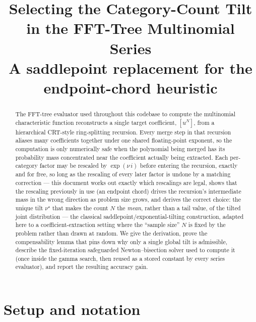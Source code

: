 \documentclass[11pt]{article}
\title{Selecting the Category-Count Tilt in the FFT-Tree Multinomial Series\\
\large A saddlepoint replacement for the endpoint-chord heuristic}
\author{}
\date{}
\begin{document}
\maketitle

\begin{abstract}
The FFT-tree evaluator used throughout this codebase to compute the multinomial
characteristic function reconstructs a single target coefficient, $[u^N]$, from a
hierarchical CRT-style ring-splitting recursion. Every merge step in that recursion
aliases many coefficients together under one shared floating-point exponent, so the
computation is only numerically safe when the polynomial being merged has its
probability mass concentrated near the coefficient actually being extracted. Each
per-category factor may be rescaled by $\exp(\nu\, i)$ before entering the recursion,
exactly and for free, so long as the rescaling of every later factor is undone by a
matching correction --- this document works out exactly which rescalings are legal,
shows that the rescaling previously in use (an endpoint chord) drives the recursion's
intermediate mass in the wrong direction as problem size grows, and derives the
correct choice: the unique tilt $\nu^\star$ that makes the count $N$ the \emph{mean},
rather than a tail value, of the tilted joint distribution --- the classical
saddlepoint/exponential-tilting construction, adapted here to a coefficient-extraction
setting where the ``sample size'' $N$ is fixed by the problem rather than drawn at
random. We give the derivation, prove the compensability lemma that pins down why only
a single global tilt is admissible, describe the fixed-iteration safeguarded
Newton--bisection solver used to compute it (once inside the gamma search, then reused
as a stored constant by every series evaluator), and report the resulting accuracy
gain.
\end{abstract}

\tableofcontents

\section{Setup and notation}
\label{sec:setup}
\end{document}
